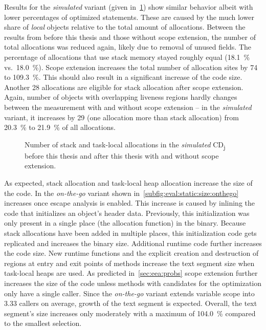 		Results for the \emph{simulated} variant (given in~\cref{fig:eval:static:numallocs:simulated}) show similar behavior
		albeit with lower percentages of optimized statements. These are caused by the much lower share of \emph{local}
		objects relative to the total amount of allocations. Between the results from before this thesis and those without
		scope extension, the number of total allocations was reduced again, likely due to removal of unused fields. The
		percentage of allocations that use stack memory stayed roughly equal (18.1~\% vs.~18.0~\%). Scope extension
		increases the total number of allocation sites by 74 to 109.3~\%. This should also result in a significant increase
		of the code size. Another 28 allocations are eligible for stack allocation after scope extension. Again, number of
		objects with overlapping liveness regions hardly changes between the measurement with and without scope extension
		– in the \emph{simulated} variant, it increases by 29 (one allocation more than stack allocation) from 20.3~\% to
		21.9~\% of all allocations.

		\begin{figure}
			\centering
			

			\caption[Number of stack and task-local allocations in \emph{simulated} CD\textsubscript{j}]{%
				Number of stack and task-local allocations in the \emph{simulated} CD\textsubscript{j} before this thesis and
				after this thesis with and without scope extension.}
			\label{fig:eval:static:numallocs:simulated}
		\end{figure}

		As expected, stack allocation and task-local heap allocation increase the size of the code. In the \emph{on-the-go}
		variant shown in~\cref{subfig:eval:static:size:onthego} increases once escape analysis is enabled. This increase is
		caused by inlining the code that initializes an object's header data. Previously, this initialization was only
		present in a single place (the allocation function) in the binary. Because stack allocations have been added in
		multiple places, this initialization code gets replicated and increases the binary size. Additional runtime code
		further increases the code size. New runtime functions and the explicit creation and destruction of regions at entry
		and exit points of methods increase the text segment size when task-local heaps are used. As predicted
		in~\cref{sec:eea:probs} scope extension further increases the size of the code unless methods with candidates for
		the optimization only have a single caller. Since the \emph{on-the-go} variant extends variable scope into 3.33
		callers on average, growth of the text segment is expected. Overall, the text segment's size increases only
		moderately with a maximum of 104.0~\% compared to the smallest selection.

